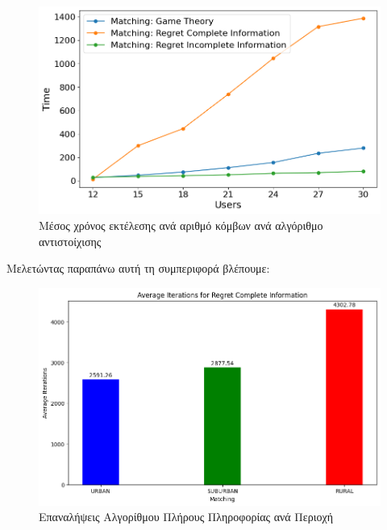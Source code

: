 \begin{figure}[H]
    \centering
    \includegraphics[width=\textwidth]{figures/chapter4/Time_vs_Users.png}
    \caption{Μέσος χρόνος εκτέλεσης ανά αριθμό κόμβων ανά αλγόριθμο αντιστοίχισης}
    \label{fig40}
\end{figure}

Μελετώντας παραπάνω αυτή τη συμπεριφορά βλέπουμε:

\begin{figure}[H]
    \centering
    \includegraphics[width=\textwidth]{figures/chapter4/Average_Iterations_per_area_RCI.png}
    \caption{Επαναλήψεις Αλγορίθμου Πλήρους Πληροφορίας ανά Περιοχή}
    \label{fig41}
\end{figure}

\newpage

